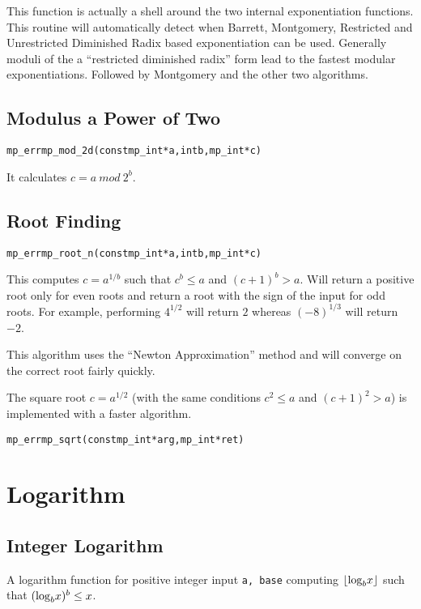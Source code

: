 \documentclass[synpaper]{book}
\def\log{{\rm log}}
\def\mod{{\mathit\ mod\ }}
\newcommand{\floor}[1]{\left\lfloor{#1}\right\rfloor}
\begin{document}
This function is actually a shell around the two internal exponentiation functions.  This routine
will automatically detect when Barrett, Montgomery, Restricted and Unrestricted Diminished Radix
based exponentiation can be used.  Generally moduli of the a ``restricted diminished radix'' form
lead to the fastest modular exponentiations. Followed by Montgomery and the other two algorithms.

\section{Modulus a Power of Two}
\begin{alltt}
mp_err mp_mod_2d(const mp_int *a, int b, mp_int *c)
\end{alltt}
It calculates $c = a \mod 2^b$.

\section{Root Finding}
\begin{alltt}
mp_err mp_root_n(const mp_int *a, int b, mp_int *c)
\end{alltt}
This computes $c = a^{1/b}$ such that $c^b \le a$ and $(c+1)^b > a$. Will return a positive root
only for even roots and return a root with the sign of the input for odd roots.  For example,
performing $4^{1/2}$ will return $2$ whereas $(-8)^{1/3}$ will return $-2$.

This algorithm uses the ``Newton Approximation'' method and will converge on the correct root
fairly quickly.

The square root  $c = a^{1/2}$ (with the same conditions $c^2 \le a$ and $(c+1)^2 > a$) is
implemented with a faster algorithm.

\begin{alltt}
mp_err mp_sqrt(const mp_int *arg, mp_int *ret)
\end{alltt}

\chapter{Logarithm}
\section{Integer Logarithm}
A logarithm function for positive integer input \texttt{a, base} computing  $\floor{\log_bx}$ such
that $(\log_b x)^b \le x$.
\end{document}
